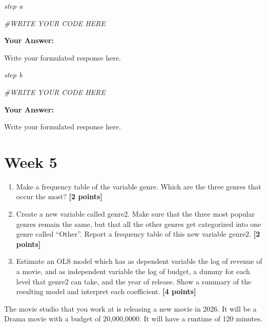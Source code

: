 \documentclass[
]{article}
\newenvironment{Shaded}{\begin{snugshade}}{\end{snugshade}}
\newcommand{\CommentTok}[1]{\textcolor[rgb]{0.56,0.35,0.01}{\textit{#1}}}
\providecommand{\tightlist}{%
  \setlength{\itemsep}{0pt}\setlength{\parskip}{0pt}}
\begin{document}
\emph{step a}

\begin{Shaded}
\begin{Highlighting}[]
\CommentTok{\#WRITE YOUR CODE HERE}
\end{Highlighting}
\end{Shaded}

\textbf{Your Answer:}

Write your formulated response here.

\emph{step b}

\begin{Shaded}
\begin{Highlighting}[]
\CommentTok{\#WRITE YOUR CODE HERE}
\end{Highlighting}
\end{Shaded}

\textbf{Your Answer:}

Write your formulated response here.

\section{Week 5}\label{week-5}

\begin{enumerate}
\def\labelenumi{\alph{enumi}.}
\tightlist
\item
  Make a frequency table of the variable genre. Which are the three
  genres that occur the most? \textbf{[2 points]}
\item
  Create a new variable called genre2. Make sure that the three most
  popular genres remain the same, but that all the other genres get
  categorized into one genre called ``Other''. Report a frequency table
  of this new variable genre2. \textbf{[2 points]}
\item
  Estimate an OLS model which has as dependent variable the log of
  revenue of a movie, and as independent variable the log of budget, a
  dummy for each level that genre2 can take, and the year of release.
  Show a summary of the resulting model and interpret each coefficient.
  \textbf{[4 points]}
\end{enumerate}

The movie studio that you work at is releasing a new movie in 2026. It
will be a Drama movie with a budget of 20,000,0000. It will have a
runtime of 120 minutes.
\end{document}
